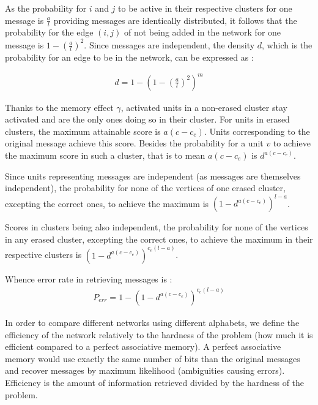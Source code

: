 \documentclass[english,11pt,twocolumn]{article}
\theoremstyle{definition}
\begin{document}
	As the probability for $i$ and $j$ to be active in their respective clusters for one message is $\frac{a}{l}$ providing messages are identically distributed, it follows that the probability for the edge $(i,j)$ of not being added in the network for one message is $1 - \left(\frac{a}{l}\right)^2$. Since messages are independent, the density $d$, which is the probability for an edge to be in the network, can be expressed as :
	
	\begin{align}
		\label{formula_density}
		d = 1 - \left( 1 - \left(\frac{a}{l}\right)^2 \right)^m 
	\end{align}		
	
	Thanks to the memory effect $\gamma$, activated units in a non-erased cluster stay activated and are the only ones doing so in their cluster. For units in erased clusters, the maximum attainable score is $a(c - c_e)$. Units corresponding to the original message achieve this score. Besides the probability for a unit $v$ to achieve the maximum score in such a cluster, that is to mean $a(c-c_e)$ is $d^{a(c-c_e)}$.
	
	
	Since units representing messages are independent (as messages are themselves independent), the probability for none of the vertices of one erased cluster, excepting the correct ones, to achieve the maximum is $\left(1 - d^	{a(c-c_e)}\right)^{l-a}$.
	
	Scores in clusters being also independent, the probability for none of the vertices in any erased cluster, excepting the correct ones, to achieve the maximum in their respective clusters is $\left(1 - d^	{a(c-c_e)}\right)^{c_e(l-a)}$.
	
	Whence error rate in retrieving messages is : 
	\begin{align}	
	P_{err} = 1 -	\left(1 - d^	{a(c-c_e)}\right)^{c_e(l-a)} 
	\end{align}	 
	
	In order to compare different networks using different alphabets, we define the efficiency of the network relatively to the hardness of the problem (how much it is efficient compared to a perfect associative memory). A perfect associative memory would use exactly the same number of bits than the original messages and recover messages by maximum likelihood (ambiguities causing errors). Efficiency is the amount of information retrieved divided by the hardness of the problem.
	
\end{document}
